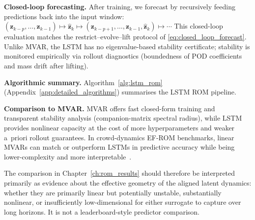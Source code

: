 \noindent\textbf{Closed-loop forecasting.}
After training, we forecast by recursively feeding predictions back into
the input window:
$(\mathbf{z}_{k-p},\ldots,\mathbf{z}_{k-1})
\mapsto \widehat{\mathbf{z}}_{k}
\mapsto (\mathbf{z}_{k-p+1},\ldots,\mathbf{z}_{k-1},\widehat{\mathbf{z}}_{k})
\mapsto\cdots$
This closed-loop evaluation matches the restrict--evolve--lift protocol of
\eqref{eq:closed_loop_forecast}.
Unlike MVAR, the LSTM has no eigenvalue-based stability certificate;
stability is monitored empirically via rollout diagnostics
(boundedness of POD coefficients and mass drift after lifting).

\noindent\textbf{Algorithmic summary.}
Algorithm~\ref{alg:lstm_rom}
(Appendix~\ref{app:detailed_algorithms}) summarises the LSTM ROM pipeline.

\noindent\textbf{Comparison to MVAR.}
MVAR offers fast closed-form training and transparent stability analysis
(companion-matrix spectral radius), while LSTM provides nonlinear
capacity at the cost of more hyperparameters and weaker a~priori rollout
guarantees.
In crowd-dynamics EF-ROM benchmarks, linear MVARs can match or outperform
LSTMs in predictive accuracy while being lower-complexity and more
interpretable~\cite{alvarez2025eqfree}.

The comparison in Chapter~\ref{ch:rom_results} should therefore be
interpreted primarily as evidence about the effective geometry of the
aligned latent dynamics: whether they are primarily linear but
potentially unstable, substantially nonlinear, or insufficiently
low-dimensional for either surrogate to capture over long
horizons. It is not a leaderboard-style predictor comparison.
